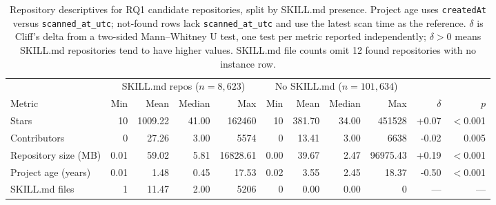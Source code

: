 \begin{table}[t]
\centering
\caption{Repository descriptives for RQ1 candidate repositories, split by SKILL.md presence. Project age uses \texttt{createdAt} versus \texttt{scanned\_at\_utc}; not-found rows lack \texttt{scanned\_at\_utc} and use the latest scan time as the reference. $\delta$ is Cliff's delta from a two-sided Mann--Whitney U test, one test per metric reported independently; $\delta > 0$ means SKILL.md repositories tend to have higher values. SKILL.md file counts omit 12 found repositories with no instance row.}
\label{tab:repo-descriptives-skill-presence}
\begin{tabular}{l rrrr rrrr rr}
\toprule
 & \multicolumn{4}{c}{SKILL.md repos ($n=8,623$)} & \multicolumn{4}{c}{No SKILL.md ($n=101,634$)} & & \\
Metric & Min & Mean & Median & Max & Min & Mean & Median & Max & $\delta$ & $p$ \\
\midrule
Stars & 10 & 1009.22 & 41.00 & 162460 & 10 & 381.70 & 34.00 & 451528 & +0.07 & $<$0.001 \\
Contributors & 0 & 27.26 & 3.00 & 5574 & 0 & 13.41 & 3.00 & 6638 & -0.02 & 0.005 \\
Repository size (MB) & 0.01 & 59.02 & 5.81 & 16828.61 & 0.00 & 39.67 & 2.47 & 96975.43 & +0.19 & $<$0.001 \\
Project age (years) & 0.01 & 1.48 & 0.45 & 17.53 & 0.02 & 3.55 & 2.45 & 18.37 & -0.50 & $<$0.001 \\
SKILL.md files & 1 & 11.47 & 2.00 & 5206 & 0 & 0.00 & 0.00 & 0 & --- & --- \\
\bottomrule
\end{tabular}
\end{table}
